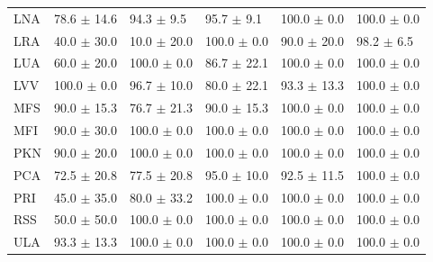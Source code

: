 \begin{table}[htb!]
{\begin{tabular}{llllll}
LNA                         & 78.6  $\pm$   14.6 & 94.3  $\pm$   9.5    & 95.7  $\pm$   9.1     & 100.0  $\pm$   0.0        & 100.0  $\pm$   0.0          \\ 
LRA                         & 40.0  $\pm$   30.0 & 10.0  $\pm$   20.0   & 100.0  $\pm$   0.0    & 90.0  $\pm$   20.0        & 98.2  $\pm$   6.5          \\ 
LUA                         & 60.0  $\pm$   20.0 & 100.0  $\pm$   0.0   & 86.7  $\pm$   22.1    & 100.0  $\pm$   0.0        & 100.0  $\pm$   0.0          \\ 
LVV                         & 100.0  $\pm$   0.0 & 96.7  $\pm$   10.0   & 80.0  $\pm$   22.1    & 93.3  $\pm$   13.3        & 100.0  $\pm$   0.0          \\ 
MFS                         & 90.0  $\pm$   15.3 & 76.7  $\pm$   21.3   & 90.0  $\pm$   15.3    & 100.0  $\pm$   0.0        & 100.0  $\pm$   0.0          \\ 
MFI                         & 90.0  $\pm$   30.0 & 100.0  $\pm$   0.0   & 100.0  $\pm$   0.0    & 100.0  $\pm$   0.0        & 100.0  $\pm$   0.0          \\ 
PKN                         & 90.0  $\pm$   20.0 & 100.0  $\pm$   0.0   & 100.0  $\pm$   0.0    & 100.0  $\pm$   0.0        & 100.0  $\pm$   0.0          \\ 
PCA                         & 72.5  $\pm$   20.8 & 77.5  $\pm$   20.8   & 95.0  $\pm$   10.0    & 92.5  $\pm$   11.5        & 100.0  $\pm$   0.0          \\ 
PRI                         & 45.0  $\pm$   35.0 & 80.0  $\pm$   33.2   & 100.0  $\pm$   0.0    & 100.0  $\pm$   0.0        & 100.0  $\pm$   0.0          \\ 
RSS                         & 50.0  $\pm$   50.0 & 100.0  $\pm$   0.0   & 100.0  $\pm$   0.0    & 100.0  $\pm$   0.0        & 100.0  $\pm$   0.0          \\ 
ULA                         & 93.3  $\pm$   13.3 & 100.0  $\pm$   0.0   & 100.0  $\pm$   0.0    & 100.0  $\pm$   0.0        & 100.0  $\pm$   0.0          \\ \hline\hline
\end{tabular}
}
\end{table}

